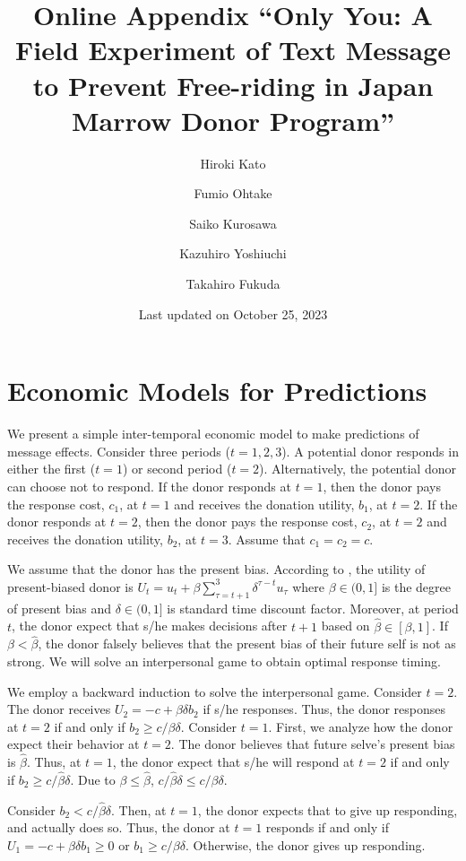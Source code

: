 \documentclass[
]{article}
\title{Online Appendix
``Only You: A Field Experiment of Text Message to Prevent Free-riding in Japan Marrow Donor Program''}
\author{Hiroki Kato \and Fumio Ohtake \and Saiko Kurosawa \and Kazuhiro Yoshiuchi \and Takahiro Fukuda}
\date{Last updated on October 25, 2023}
\begin{document}
\maketitle

{
\setcounter{tocdepth}{2}
\tableofcontents
}
\hypertarget{economic-models-for-predictions}{%
\section{Economic Models for Predictions}\label{economic-models-for-predictions}}

We present a simple inter-temporal economic model to make predictions of message effects. Consider three periods (\(t = 1, 2, 3\)). A potential donor responds in either the first (\(t = 1\)) or second period (\(t = 2\)). Alternatively, the potential donor can choose not to respond. If the donor responds at \(t = 1\), then the donor pays the response cost, \(c_1\), at \(t = 1\) and receives the donation utility, \(b_1\), at \(t = 2\). If the donor responds at \(t = 2\), then the donor pays the response cost, \(c_2\), at \(t = 2\) and receives the donation utility, \(b_2\), at \(t = 3\). Assume that \(c_1 = c_2 = c\).

We assume that the donor has the present bias. According to \citet{Laibson1997}, the utility of present-biased donor is \(U_t = u_t + \beta \sum_{\tau = t + 1}^{3} \delta^{\tau - t} u_{\tau}\) where \(\beta \in (0, 1]\) is the degree of present bias and \(\delta \in (0, 1]\) is standard time discount factor. Moreover, at period \(t\), the donor expect that s/he makes decisions after \(t + 1\) based on \(\hat{\beta} \in [\beta, 1]\). If \(\beta < \hat{\beta}\), the donor falsely believes that the present bias of their future self is not as strong. We will solve an interpersonal game \citep{ODonoghue2001} to obtain optimal response timing.

We employ a backward induction to solve the interpersonal game. Consider \(t = 2\). The donor receives \(U_2 = -c + \beta \delta b_2\) if s/he responses. Thus, the donor responses at \(t = 2\) if and only if \(b_2 \ge c/\beta\delta\). Consider \(t = 1\). First, we analyze how the donor expect their behavior at \(t = 2\). The donor believes that future selve's present bias is \(\hat{\beta}\). Thus, at \(t = 1\), the donor expect that s/he will respond at \(t = 2\) if and only if \(b_2 \ge c/\hat{\beta}\delta\). Due to \(\beta \le \hat{\beta}\), \(c/\hat{\beta}\delta \le c/\beta\delta\).

Consider \(b_2 < c / \hat{\beta}\delta\). Then, at \(t = 1\), the donor expects that to give up responding, and actually does so. Thus, the donor at \(t = 1\) responds if and only if \(U_1 = -c + \beta\delta b_1 \ge 0\) or \(b_1 \ge c/\beta\delta\). Otherwise, the donor gives up responding.
\end{document}
